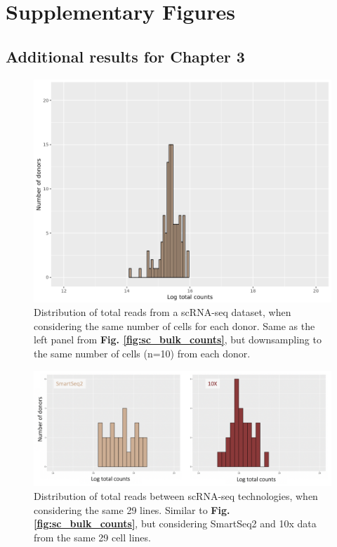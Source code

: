 
\chapter{Supplementary Figures}

\section{Additional results for Chapter 3}

\begin{figure}[h]
    \centering
    \includegraphics[width=12cm]{Appendix2/Fig/suppl_distribution_fixed_ncells.png}
    \caption[Distribution of total reads scRNA-seq same number of cells per donor]{Distribution of total reads from a scRNA-seq dataset, when considering the same number of cells for each donor.
    Same as the left panel from \textbf{Fig. \ref{fig:sc_bulk_counts}}, but downsampling to the same number of cells (n=10) from each donor.}
    \label{suppl_fig:counts_sc_ncells}
\end{figure}

\begin{figure}[h]
    \centering
    \includegraphics[width=15cm]{Appendix2/Fig/suppl_distribution_10x_ss2.png}
    \caption[Distribution of total reads between scRNA-seq technologies]{Distribution of total reads between scRNA-seq technologies, when considering the same 29 lines.
    Similar to \textbf{Fig. \ref{fig:sc_bulk_counts}}, but considering SmartSeq2 and 10x data from the same 29 cell lines.}
    \label{suppl_fig:counts_sc_technologies}
\end{figure}

